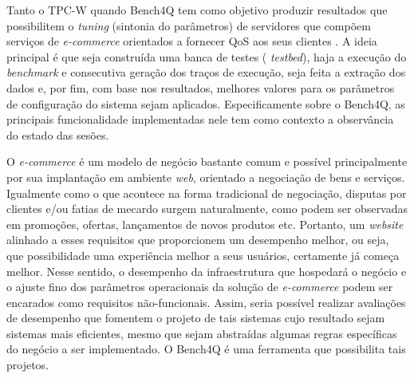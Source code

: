 Tanto o TPC-W quando Bench4Q tem como objetivo produzir resultados que possibilitem o \textit{tuning} (sintonia do parâmetros) de servidores que compõem serviços de \textit{e-commerce} orientados a fornecer QoS aos seus clientes \cite{Menasce2002, Zhang2011}.  A ideia principal é que seja construída uma banca de testes (\textit{ testbed}), haja a execução do \textit{ benchmark} e consecutiva geração dos traços de execução, seja feita a extração dos dados e, por fim, com base nos resultados, melhores valores para os parâmetros de configuração do sistema sejam aplicados. Especificamente sobre o Bench4Q, as principais funcionalidade implementadas nele tem como contexto a observância do estado das sesões.

O \textit{ e-commerce} é um modelo de negócio bastante comum e possível principalmente por sua implantação em ambiente \textit{ web}, orientado a negociação de bens e serviços. Igualmente como o que acontece na forma tradicional de negociação, disputas por clientes e/ou fatias de mecardo surgem naturalmente, como podem ser observadas em promoções, ofertas, lançamentos de novos produtos etc. Portanto, um \textit{ website} alinhado a esses requisitos que proporcionem um desempenho melhor, ou seja, que possibilidade uma experiência melhor a seus usuários, certamente já começa melhor. Nesse sentido, o desempenho da infraestrutura que hospedará o negócio e o ajuste fino dos parâmetros operacionais da solução de \textit{ e-commerce} podem ser encarados como requisitos não-funcionais. Assim, seria possível realizar avaliações de desempenho que fomentem o projeto de tais sistemas cujo resultado sejam sistemas mais eficientes, mesmo que sejam abstraídas algumas regras específicas do negócio a ser implementado. O Bench4Q é uma ferramenta que possibilita tais projetos.

